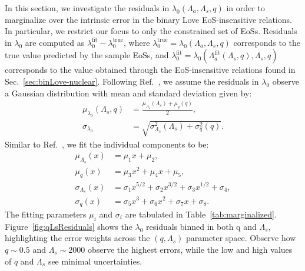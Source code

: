 \documentclass[prd,twocolumn,nofootinbib,superscriptaddress,amsmath,amssymb]{revtex4-1}
\begin{document}
In this section, we investigate the residuals in $\lambda_0(\Lambda_a,\Lambda_s,q)$ in order to marginalize over the intrinsic error in the binary Love EoS-insensitive relations.
In particular, we restrict our focus to only the constrained set of EoSs.
Residuals in $\lambda_0$ are computed as $\lambda_0^{\text{fit}}-\lambda_0^{\text{true}}$, where $\lambda_0^{\text{true}}=\lambda_0(\Lambda_a,\Lambda_s,q)$ corresponds to the true value predicted by the sample EoSs, and $\lambda_0^{\text{fit}}=\lambda_0(\Lambda_a^{\text{fit}}(\Lambda_s,q),\Lambda_s,q)$ corresponds to the value obtained through the EoS-insensitive relations found in Sec.~\ref{sec:binLove-nuclear}.
Following Ref.~\cite{Katerina:residuals}, we assume the residuals in $\lambda_0$ observe a Gaussian distribution with mean and standard deviation given by:
\begin{align}
\mu_{\lambda_0}(\Lambda_s,q) &=\frac{\mu_{\Lambda_s}(\Lambda_s)+\mu_{q}(q)}{2},\\ 
\sigma_{\lambda_0} &=\sqrt{\sigma_{\Lambda_s}^2(\Lambda_s) + \sigma_{q}^2(q)}. 
\end{align}
Similar to Ref.~\cite{Katerina:residuals}, we fit the individual components to be:
\begin{align}
\mu_{\Lambda_s}(x) &= \mu_1 x + \mu_2, \label{eq:margFit1}\\ 
\mu_{q}(x) &= \mu_3 x^2 + \mu_4 x + \mu_5, \label{eq:margFit2}\\ 
\sigma_{\Lambda_s}(x) &= \sigma_1 x^{5/2} + \sigma_2 x^{3/2} +  \sigma_3 x^{1/2} + \sigma_4, \label{eq:margFit3}\\ 
\sigma_{q}(x) &= \sigma_5 x^3 + \sigma_6 x^2 + \sigma_7 x + \sigma_8. \label{eq:margFit4}
\end{align}
The fitting parameters $\mu_i$ and $\sigma_i$ are tabulated in Table~\ref{tab:marginalized}.
Figure~\ref{fig:qLsResiduals} shows the $\lambda_0$ residuals binned in both q and $\Lambda_s$, highlighting the error weights across the $(q,\Lambda_s)$ parameter space.
Observe how $q\sim0.5$ and $\Lambda_s\sim2000$ observe the highest errors, while the low and high values of $q$ and $\Lambda_s$ see minimal uncertainties.
\end{document}
